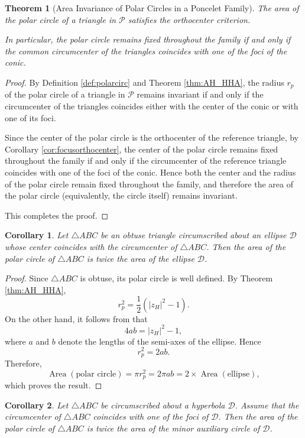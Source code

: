 \documentclass[11pt,reqno]{amsart}
\newtheorem{theorem}{Theorem}[section]
\newtheorem{corollary}{Corollary}[section]
\theoremstyle{definition}
\numberwithin{equation}{section}
\begin{document}
\begin{theorem}[Area Invariance of Polar Circles in a Poncelet Family]
The area of the polar circle of a triangle in $\mathcal P$ satisfies the orthocenter criterion.

In particular, the polar circle remains fixed throughout the family if and only if the common circumcenter of the triangles coincides with one of the foci of the conic.
\end{theorem}
\begin{proof}
By Definition \ref{def:polarcirc} and Theorem \ref{thm:AH_HHA}, the radius $r_p$ of the polar circle of a triangle in $\mathcal P$ remains invariant if and only if the circumcenter of the triangles coincides either with the center of the conic or with one of its foci.

Since the center of the polar circle is the orthocenter of the reference triangle, by Corollary \ref{cor:focusorthocenter}, the center of the polar circle remains fixed throughout the family if and only if the circumcenter of the reference triangle coincides with one of the foci of the conic. Hence both the center and the radius of the polar circle remain fixed throughout the family, and therefore the area of the polar circle (equivalently, the circle itself) remains invariant.

This completes the proof.
\end{proof}


\begin{corollary}
Let $\triangle ABC$ be an obtuse triangle circumscribed about an ellipse $\mathcal D$ whose center coincides with the circumcenter of $\triangle ABC$. Then the area of the polar circle of $\triangle ABC$ is twice the area of the ellipse $\mathcal D$.
\end{corollary}

\begin{proof}
Since $\triangle ABC$ is obtuse, its polar circle is well defined. By Theorem \ref{thm:AH_HHA},
\[
r_p^2=\frac12\left(|z_H|^2-1\right).
\]
On the other hand, it follows from \cite[Corollary 2.2]{Murad2026b} that
\[
4ab=|z_H|^2-1,
\]
where $a$ and $b$ denote the lengths of the semi-axes of the ellipse. Hence
\[
r_p^2=2ab.
\]
Therefore,
\[
\operatorname{Area}(\text{polar circle})
=\pi r_p^2
=2\pi ab
=2\times\operatorname{Area}(\text{ellipse}),
\]
which proves the result.
\end{proof}


\begin{corollary}
Let $\triangle ABC$ be circumscribed about a hyperbola $\mathcal D$. Assume that the circumcenter of $\triangle ABC$ coincides with one of the foci of $\mathcal D$. Then the area of the polar circle of $\triangle ABC$ is twice the area of the minor auxiliary circle of $\mathcal D$.
\end{corollary}
\end{document}
